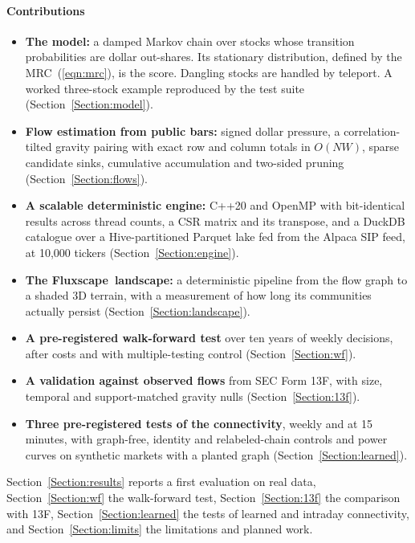 \documentclass[preprint,3p,twocolumn]{elsarticle}
\newcommand{\FS}{Fluxscape}
\begin{document}
\paragraph{Contributions}
\begin{itemize}
\item \textbf{The model:} a damped Markov chain over stocks whose transition probabilities are dollar out-shares. Its stationary distribution, defined by the MRC~(\ref{eqn:mrc}), is the score. Dangling stocks are handled by teleport. A worked three-stock example reproduced by the test suite (Section~\ref{Section:model}).
\item \textbf{Flow estimation from public bars:} signed dollar pressure, a correlation-tilted gravity pairing with exact row and column totals in $O(NW)$, sparse candidate sinks, cumulative accumulation and two-sided pruning (Section~\ref{Section:flows}).
\item \textbf{A scalable deterministic engine:} C++20 and OpenMP with bit-identical results across thread counts, a CSR matrix and its transpose, and a DuckDB catalogue over a Hive-partitioned Parquet lake fed from the Alpaca SIP feed, at 10,000 tickers (Section~\ref{Section:engine}).
\item \textbf{The \FS\ landscape:} a deterministic pipeline from the flow graph to a shaded 3D terrain, with a measurement of how long its communities actually persist (Section~\ref{Section:landscape}).
\item \textbf{A pre-registered walk-forward test} over ten years of weekly decisions, after costs and with multiple-testing control (Section~\ref{Section:wf}).
\item \textbf{A validation against observed flows} from SEC Form 13F, with size, temporal and support-matched gravity nulls (Section~\ref{Section:13f}).
\item \textbf{Three pre-registered tests of the connectivity}, weekly and at 15 minutes, with graph-free, identity and relabeled-chain controls and power curves on synthetic markets with a planted graph (Section~\ref{Section:learned}).
\end{itemize}
Section~\ref{Section:results} reports a first evaluation on real data, Section~\ref{Section:wf} the walk-forward test, Section~\ref{Section:13f} the comparison with 13F, Section~\ref{Section:learned} the tests of learned and intraday connectivity, and Section~\ref{Section:limits} the limitations and planned work.

\end{document}
